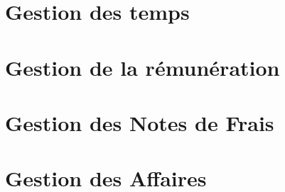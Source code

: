 \documentclass[12pt]{scrreprt}
\author{Direction des opérations}
\date{Avril 2016}
\begin{document}



\chapter{Gestion des temps}



\chapter{Gestion de la rémunération}

\chapter{Gestion des Notes de Frais}


\chapter{Gestion des Affaires}

% 
\end{document}
